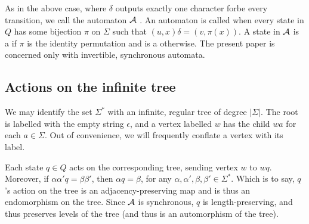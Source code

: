 \documentclass[11pt]{article}
\begin{document}
As in the above case, where $\delta$ outputs exactly one character forbe
every transition, we call the automaton $\mathcal{A}$ . An
automaton is called  when every state in $Q$ has some
bijection $\pi$ on $\Sigma$ such that $(u, x)\delta = (v, \pi(x))$. A
state in $\mathcal{A}$ is a  if $\pi$ is the identity
permutation and is a  otherwise. The present paper
is concerned only with invertible, synchronous automata.

\subsection{Actions on the infinite tree}

We may identify the set $\Sigma^*$ with an infinite, regular tree of
degree $|\Sigma|$. The root is labelled with the empty string
$\epsilon$, and a vertex labelled $w$ has the child $wa$ for each
$a \in \Sigma$. Out of convenience, we will frequently conflate a
vertex with its label.

\begin{center}
\end{center}

Each state $q \in Q$ acts on the corresponding tree, sending vertex
$w$ to $wq$. Moreover, if $\alpha \alpha' q = \beta \beta'$, then
$\alpha q = \beta$, for any
$\alpha, \alpha', \beta, \beta' \in \Sigma^*$. Which is to say, $q$'s
action on the tree is an adjacency-preserving map and is thus an
endomorphism on the tree. Since $\mathcal{A}$ is synchronous, $q$ is
length-preserving, and thus preserves levels of the tree (and thus is
an automorphism of the tree).
\end{document}
